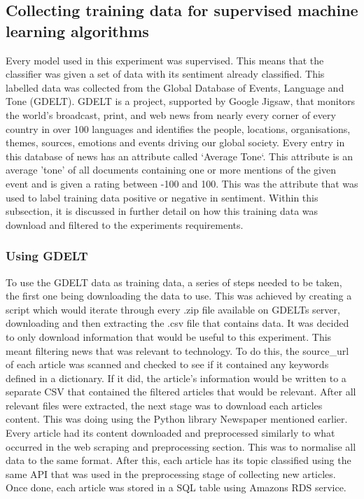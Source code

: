 \documentclass[a4paper,11pt]{report}
\begin{document}
\subsection{Collecting training data for supervised machine learning algorithms}
Every model used in this experiment was supervised. This means that the classifier was given a set of data with its sentiment already classified. This labelled data was collected from the Global Database of Events, Language and Tone (GDELT). GDELT is a project, supported by Google Jigsaw, that monitors the world's broadcast, print, and web news from nearly every corner of every country in over 100 languages and identifies the people, locations, organisations, themes, sources, emotions and events driving our global society. Every entry in this database of news has an attribute called `Average Tone`. This attribute is an average 'tone' of all documents containing one or more mentions of the given event and is given a rating between -100 and 100. This was the attribute that was used to label training data positive or negative in sentiment. Within this subsection, it is discussed in further detail on how this training data was download and filtered to the experiments requirements.

\subsubsection{Using GDELT}
To use the GDELT data as training data, a series of steps needed to be taken, the first one being downloading the data to use. This was achieved by creating a script which would iterate through every .zip file available on GDELTs server, downloading and then extracting the .csv file that contains data. It was decided to only download information that would be useful to this experiment. This meant filtering news that was relevant to technology. To do this, the source\_url of each article was scanned and checked to see if it contained any keywords defined in a dictionary. If it did, the article's information would be written to a separate CSV that contained the filtered articles that would be relevant. After all relevant files were extracted, the next stage was to download each articles content. This was doing using the Python library Newspaper mentioned earlier. Every article had its content downloaded and preprocessed similarly to what occurred in the web scraping and preprocessing section. This was to normalise all data to the same format. After this, each article has its topic classified using the same API that was used in the preprocessing stage of collecting new articles. Once done, each article was stored in a SQL table using Amazons RDS service.
\end{document}
